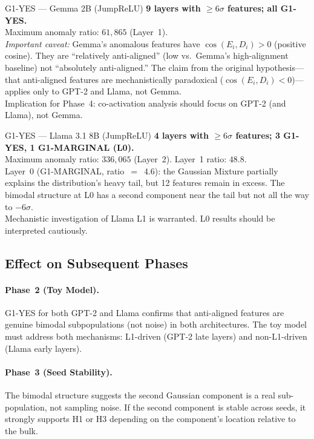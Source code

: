 \documentclass[11pt,a4paper]{article}
\newcommand{\cosED}{\cos(E_i, D_i)}
\begin{document}
\begin{gatedecision}{G1-YES --- Gemma 2B (JumpReLU)}
\textbf{9 layers with $\geq 6\sigma$ features; all G1-YES.}\\
Maximum anomaly ratio: $61{,}865$ (Layer~1). \\
\textit{Important caveat:} Gemma's anomalous features have $\cosED > 0$ (positive cosine). They are ``relatively anti-aligned'' (low vs.\ Gemma's high-alignment baseline) not ``absolutely anti-aligned.'' The claim from the original hypothesis---that anti-aligned features are mechanistically paradoxical ($\cosED < 0$)---applies only to GPT-2 and Llama, not Gemma.\\
Implication for Phase~4: co-activation analysis should focus on GPT-2 (and Llama), not Gemma.
\end{gatedecision}

\begin{gatedecision}{G1-YES --- Llama 3.1 8B (JumpReLU)}
\textbf{4 layers with $\geq 6\sigma$ features; 3 G1-YES, 1 G1-MARGINAL (L0).}\\
Maximum anomaly ratio: $336{,}065$ (Layer~2). Layer~1 ratio: $48.8$.\\
Layer~0 (G1-MARGINAL, ratio~$=$~4.6): the Gaussian Mixture partially explains the distribution's heavy tail, but 12 features remain in excess. The bimodal structure at L0 has a second component near the tail but not all the way to $-6\sigma$.\\
Mechanistic investigation of Llama L1 is warranted. L0 results should be interpreted cautiously.
\end{gatedecision}

\subsection{Effect on Subsequent Phases}

\paragraph{Phase~2 (Toy Model).} G1-YES for both GPT-2 and Llama confirms that anti-aligned features are genuine bimodal subpopulations (not noise) in both architectures. The toy model must address both mechanisms: L1-driven (GPT-2 late layers) and non-L1-driven (Llama early layers).

\paragraph{Phase~3 (Seed Stability).} The bimodal structure suggests the second Gaussian component is a real sub-population, not sampling noise. If the second component is stable across seeds, it strongly supports H1 or H3 depending on the component's location relative to the bulk.
\end{document}

